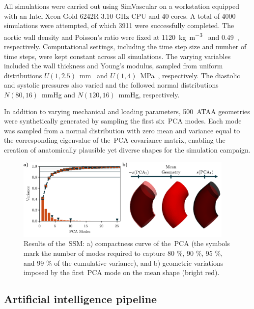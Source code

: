\documentclass[a4paper,fleqn]{cas-sc}
\begin{document}
  All simulations were carried out using SimVascular on a workstation equipped with an Intel Xeon Gold 6242R 3.10 GHz CPU and 40 cores. A total of 4000 simulations were attempted, of which 3911 were successfully completed. The aortic wall density and Poisson's ratio were fixed at 1120~\si{\kilogram\per\metre\cubed}~\cite{pasta2013,Attaran2018} and 0.49~\cite{farzaneh2019,Baumler2020}, respectively. Computational settings, including the time step size and number of time steps, were kept constant across all simulations. The varying variables included the wall thickness and Young's modulus, sampled from uniform distributions $U(1, 2.5)$~\si{\milli\meter}~\cite{Mensel2014} and $U(1, 4)$~\si{\mega\pascal}~\cite{Duprey2010}, respectively. The diastolic and systolic pressures also varied and the followed normal distributions $N(80, 16)$~\si{\mmHg} and $N(120, 16)$~\si{\mmHg}, respectively.

  In addition to varying mechanical and loading parameters, 500~\gls{ATAA} geometries were synthetically generated by sampling the first six~\gls{PCA} modes. Each mode was sampled from a normal distribution with zero mean and variance equal to the corresponding eigenvalue of the~\gls{PCA} covariance matrix, enabling the creation of anatomically plausible yet diverse shapes for the simulation campaign.
  
  \begin{figure}
    \centering
    \includegraphics[width=0.95\textwidth]{fig2}
    \caption{Results of the~\gls{SSM}: a) compactness curve of the~\gls{PCA} (the symbols mark the number of modes required to capture 80 \%, 90 \%, 95 \%, and 99 \% of the cumulative variance), and b) geometric variations imposed by the first~\gls{PCA} mode on the mean shape (bright red).}
    \label{fig:pcaRes}
  \end{figure}

\subsection{Artificial intelligence pipeline}
\end{document}
